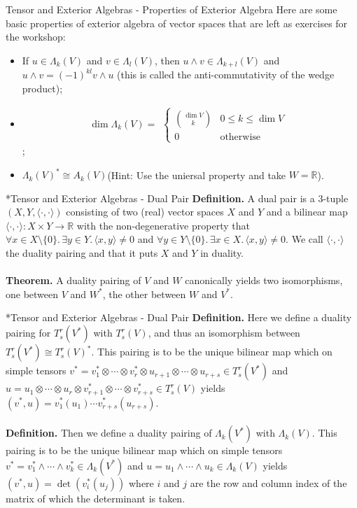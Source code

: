 \documentclass[aspectratio=169]{beamer}
\begin{document}
\begin{frame}{Tensor and Exterior Algebras - Properties of Exterior Algebra}
Here are some basic properties of exterior algebra of vector spaces that are left as exercises for the workshop:
\begin{itemize}
\item If $u\in\Lambda_k(V)$ and $v\in\Lambda_l(V)$, then $u\wedge v\in\Lambda_{k+l}(V)$ and $u\wedge v=(-1)^{kl}v\wedge u$ (this is called the anti-commutativity of the wedge product);
\item $$\dim\Lambda_k(V)=\begin{aligned}\begin{cases}\binom{\dim V}{k}&0\leq k\leq\dim V\\0&\text{otherwise}\end{cases}\end{aligned}$$;
\item $\Lambda_k(V)^*\cong A_k(V)$(Hint: Use the uniersal property and take $W=\mathbb{R}$).
\end{itemize}
\end{frame}
\begin{frame}{*Tensor and Exterior Algebras - Dual Pair}
\textbf{Definition.} A dual pair is a $3$-tuple $(X,Y,\langle\cdot,\cdot\rangle)$ consisting of two (real) vector spaces $X$ and $Y$ and a bilinear map $\langle\cdot,\cdot\rangle:X\times Y\to\mathbb{R}$ with the non-degenerative property that $\forall x\in X\setminus\{0\}.\,\exists y\in Y.\,\langle x,y\rangle\neq0$ and $\forall y\in Y\setminus\{0\}.\,\exists x\in X.\,\langle x,y\rangle\neq0$. We call $\langle\cdot,\cdot\rangle$ the duality pairing and that it puts $X$ and $Y$ in duality.
\\~\\
\textbf{Theorem.} A duality pairing of $V$ and $W$ canonically yields two isomorphisms, one between $V$ and $W^*$, the other between $W$ and $V^*$.
\end{frame}
\begin{frame}{*Tensor and Exterior Algebras - Dual Pair}
\textbf{Definition.} Here we define a duality pairing for $T^r_s(V^*)$ with $T^r_s(V)$, and thus an isomorphism between $T^r_s(V^*)\cong T^r_s(V)^*$. This pairing is to be the unique bilinear map which on simple tensors $v^{*}=v_{1}^{*} \otimes \cdots \otimes v_{r}^{*} \otimes u_{r+1} \otimes \cdots \otimes u_{r+s} \in T^r_s(V^*)$ and $u=u_{1} \otimes \cdots \otimes u_{r} \otimes v_{r+1}^{*} \otimes \cdots \otimes v_{r+s}^{*} \in T^r_s(V)$ yields $(v^*,u)=v^*_1(u_1)\cdots v^*_{r+s}(u_{r+s})$.
\\~\\
\textbf{Definition.} Then we define a duality pairing of $\Lambda_k(V^*)$ with $\Lambda_k(V)$. This pairing is to be the unique bilinear map which on simple tensors $v^*=v^*_1\wedge\cdots\wedge v^*_k\in\Lambda_k(V^*)$ and $u=u_1\wedge\cdots\wedge u_k\in\Lambda_k(V)$ yields $(v^*,u)=\det(v^*_i(u_j))$ where $i$ and $j$ are the row and column index of the matrix of which the determinant is taken.
\end{frame}
\end{document}

